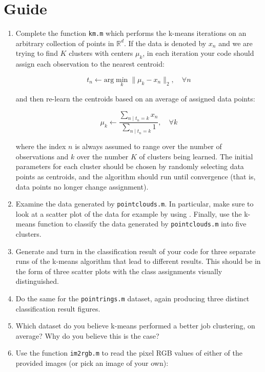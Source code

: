 \documentclass[11pt,noanswers,addpoints]{exam}
\begin{document}
\section{Guide}

\begin{enumerate}
\item  Complete the function \texttt{km.m} which performs the k-means iterations on an arbitrary
collection of points in $\mathbb{R}^d$. If the data is denoted by $x_n$ and we are trying to find $K$ clusters with centers
$\mu_k$, in each iteration your code should assign each observation to the nearest centroid:

$$t_n \leftarrow \text{arg}\min_k \|\mu_k - x_n\|_2 ,\quad \forall n$$

and then re-learn the centroids based on an average of assigned data points:

$$\mu_k \leftarrow \frac{\sum_{n\mid t_n=k} x_n}{\sum_{n\mid t_n=k} 1}, \quad \forall k$$

where the index $n$ is always assumed to range over the number of observations and $k$ over the number $K$ 
of clusters being learned. The initial parameters for each cluster should be chosen by randomly selecting
data points as centroids, and the algorithm should run until convergence (that is, data points no longer
 change assignment).

\item Examine the data generated by \texttt{pointclouds.m}. In particular, make sure to look at a
scatter plot of the data for example by using . 
Finally, use the k-means function to classify the data generated by \texttt{pointclouds.m} into five
clusters.
\item  Generate and turn in the classification result of
your code for three separate runs of the k-means algorithm that lead to different results. This should be in the form of three scatter
plots with the class assignments visually distinguished.
\item  Do the same for the \texttt{pointrings.m} dataset, again producing three distinct classification
result figures.
\item  Which dataset do you believe k-means performed a better job clustering, on average? Why
do you believe this is the case? 
\item Use the function \texttt{im2rgb.m} to read the pixel RGB values of either of the provided images (or pick an image of your own):



\end{enumerate}
\end{document}
